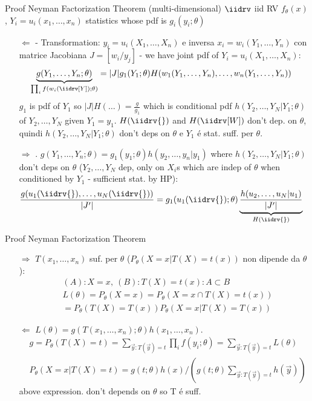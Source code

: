 \documentclass[asd-beamer.tex]{subfiles}
\begin{document}
\begin{frame}{Proof Neyman Factorization Theorem (multi-dimensional)}
	$\iidrv$ iid RV $f_{\theta}(x)$, $Y_i=u_i(x_1,\ldots,x_n)$ statistics whose pdf is $g_i(y_i;\theta)$
\begin{itemize}
	\item[$\Leftarrow$]  -
	Transformation: $y_i=u_i(X_1,\ldots,X_n)$ e inversa $x_i=w_i(Y_1,\ldots,Y_n)$ con matrice Jacobiana $J=[w_i/y_j]$ - we have joint pdf of $Y_i=u_i(X_1,\ldots,X_n)$:
	\begin{align*}
	&\underbrace{g(Y_1,\ldots,Y_n;\theta)}_{\prod_if(w_i(\iidrv[Y]);\theta)}=|J|g_1(Y_1;\theta)H(w_1(Y_1,\ldots,Y_n),\ldots,w_n(Y_1,\ldots,Y_n))
	\end{align*}
	$g_1$ is pdf of $Y_1$ so $|J|H(\ldots)=\frac{g}{g_1}$ which is conditional pdf $h(Y_2,\ldots,Y_N|Y_1;\theta)$ of $Y_2,\ldots,Y_N$ given $Y_1=y_1$. $H(\iidrv{})$ and $H(\iidrv[W])$ don't dep. on $\theta$, quindi $h(Y_2,\ldots,Y_N|Y_1;\theta)$ don't deps on $\theta$ e $Y_1$ \'e stat. suff. per $\theta$.
	\item[$\Rightarrow$] . $g(Y_1,\ldots,Y_n;\theta)=g_1(y_1;\theta)h(y_2,\ldots,y_n|y_1)$ where $h(Y_2,\ldots,Y_N|Y_1;\theta)$ don't deps on $\theta$ ($Y_2,\ldots,Y_N$ dep, only on $X_i$s which are indep of $\theta$ when conditioned by $Y_1$ - sufficient stat. by HP):
	\begin{align*}
	&\frac{g(u_1(\iidrv{}),\ldots,u_N(\iidrv{}))}{|J'|}=g_1(u_1(\iidrv{});\theta)\underbrace{\frac{h(u_2,\ldots,u_N|u_1)}{|J'|}}_{H(\iidrv{})}
	\end{align*}
\end{itemize}
\end{frame}

\begin{frame}{Proof Neyman Factorization Theorem}
\begin{itemize}
\item[$\Rightarrow$] $T(x_1,\ldots,x_n)$ suf. per $\theta$ ($P_{\theta}(X=x|T(X)=t(x))$ non dipende da $\theta$):
\begin{align*}
&(A): X=x,\ (B): T(X)=t(x): A\subset B\\
&L(\theta)=P_{\theta}(X=x)=P_{\theta}(X=x\cap T(X)=t(x))\\
&=P_{\theta}(T(X)=T(x))P_{\theta}(X=x|T(X)=T(x))
\end{align*}
\item[$\Leftarrow$] $L(\theta)=g(T(x_1,\ldots,x_n);\theta)h(x_1,\ldots,x_n)$.
\begin{align*}
&g=P_{\theta}(T(X)=t)=\sum_{\vec{y}:T(\vec{y})=t}\prod_if(y_i;\theta)=\sum_{\vec{y}:T(\vec{y})=t}L(\theta)\\
&P_{\theta}(X=x|T(X)=t)=g(t;\theta)h(x)/(g(t;\theta)\sum_{\vec{y}:T(\vec{y})=t}h(\vec{y}))
\end{align*}
above expression. don't depends on $\theta$ so T \'e suff.
\end{itemize}
\end{frame}
\end{document}
